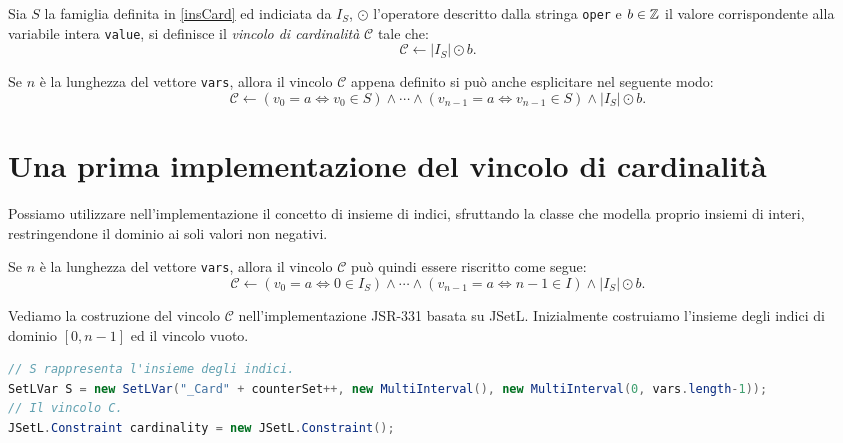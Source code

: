 \begin{defi}
Sia $S$ la famiglia definita in \ref{insCard} ed indiciata da $I_S$, $\odot$ 
l'operatore descritto dalla stringa
\texttt{oper}  e $b \in \mathbb{Z}$ il valore corrispondente alla variabile intera
\texttt{value}, si definisce il \emph{vincolo di cardinalità} $\mathcal{C}$
tale che:
\[
\mathcal{C} \leftarrow |I_S| \odot b.
\]
\end{defi}
Se $n$ è la lunghezza del vettore \texttt{vars}, allora
il vincolo $\mathcal{C}$ appena definito si può anche esplicitare nel seguente
modo:
\begin{equation}\label{eqCard1}
\mathcal{C} \leftarrow
\left(v_0 = a \Leftrightarrow v_0 \in S  \right) \wedge \cdots 
\wedge \left(v_{n-1} = a \Leftrightarrow v_{n-1} \in S\right) 
\wedge |I_S| \odot b.
\end{equation}

\section{Una prima implementazione del vincolo di cardinalità}

Possiamo utilizzare nell'implementazione
il concetto di insieme di indici, sfruttando la classe 
 che modella proprio insiemi di interi, restringendone il
dominio ai soli valori non negativi.

Se $n$ è la lunghezza del vettore \texttt{vars}, allora
il vincolo $\mathcal{C}$ può quindi essere riscritto come segue:
\begin{equation}\label{eqCard2}
\mathcal{C} \leftarrow
\left( v_0 = a \Leftrightarrow 0 \in I_S \right) \wedge \cdots 
\wedge \left(v_{n-1} = a \Leftrightarrow n-1 \in I \right) \wedge |I_S| \odot b.
\end{equation}

Vediamo la costruzione del vincolo $\mathcal{C}$ nell'implementazione
JSR-331 basata su JSetL. Inizialmente costruiamo l'insieme degli indici
di dominio $[0, n-1]$ ed il vincolo vuoto.
\begin{lstlisting}[language=Java,
                   caption = {postCardinality()},
                   frame = single]
// S rappresenta l'insieme degli indici.
SetLVar S = new SetLVar("_Card" + counterSet++, new MultiInterval(), new MultiInterval(0, vars.length-1));
// Il vincolo C.
JSetL.Constraint cardinality = new JSetL.Constraint();
\end{lstlisting}

